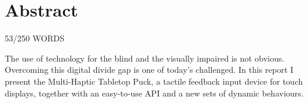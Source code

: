 \section{Abstract}
53/250 WORDS

The use of technology for the blind and the visually impaired is not obvious. Overcoming this digital divide gap is one of today's challenged. In this report I present the Multi-Haptic Tabletop Puck, a tactile feedback input device for touch displays, together with an easy-to-use API and a new sets of dynamic behaviours. 